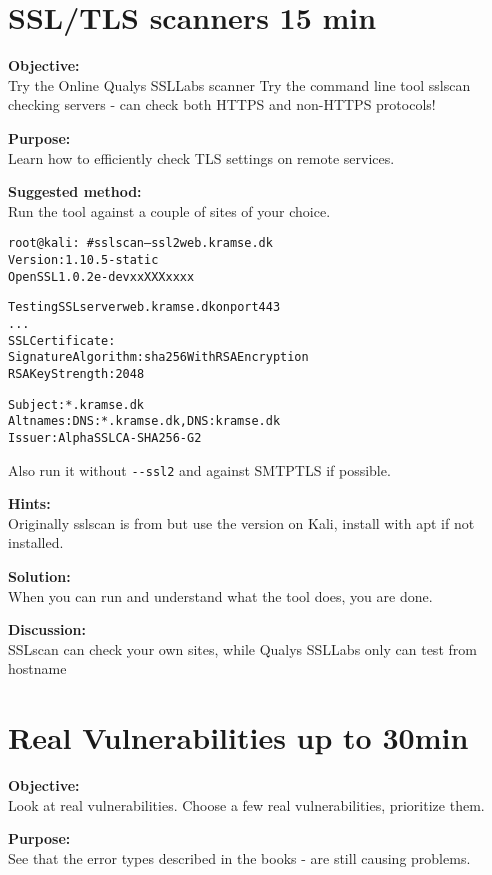 \documentclass[a4paper,11pt,notitlepage]{report}
\begin{document}
\chapter{SSL/TLS scanners 15 min}
\label{ex:sslscan}

{\bf Objective:}\\
Try the Online Qualys SSLLabs scanner 
Try the command line tool sslscan checking servers - can check both HTTPS and non-HTTPS protocols!

{\bf Purpose:}\\
Learn how to efficiently check TLS settings on remote services.

{\bf Suggested method:}\\
Run the tool against a couple of sites of your choice.

\begin{alltt}\small
root@kali:~# sslscan --ssl2 web.kramse.dk
Version: 1.10.5-static
OpenSSL 1.0.2e-dev xx XXX xxxx

Testing SSL server web.kramse.dk on port 443
...
  SSL Certificate:
Signature Algorithm: sha256WithRSAEncryption
RSA Key Strength:    2048

Subject:  *.kramse.dk
Altnames: DNS:*.kramse.dk, DNS:kramse.dk
Issuer:   AlphaSSL CA - SHA256 - G2
\end{alltt}

Also run it without \verb+--ssl2+ and against SMTPTLS if possible.

{\bf Hints:}\\
Originally sslscan is from  but use the version on Kali, install with apt if not installed.

{\bf Solution:}\\
When you can run and understand what the tool does, you are done.

{\bf Discussion:}\\
SSLscan can check your own sites, while Qualys SSLLabs only can test from hostname


\chapter{Real Vulnerabilities up to 30min}
\label{ex:real-vulns}



{\bf Objective:}\\
Look at real vulnerabilities. Choose a few real vulnerabilities, prioritize them.

{\bf Purpose:}\\
See that the error types described in the books - are still causing problems.
\end{document}
